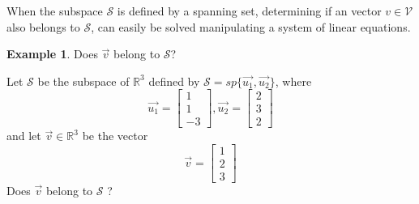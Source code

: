 \documentclass{book}
\theoremstyle{definition}
\newtheorem{example}{Example}[definition]
\theoremstyle{remark}
\newcommand{\bb}[1]{\mathbb{#1}}
\newcommand{\cc}[1]{\mathcal{#1}}
\begin{document}
When the subspace $\cc{S}$ is defined by a spanning set, determining if an vector $v \in \cc{V}$ also belongs to $\cc{S}$, can easily be solved manipulating a system of linear equations. 

\begin{example}
Does $\vec{v}$ belong to $\cc{S}$? \\
    
    \begin{tcolorbox}
        Let $\cc{S}$ be the subspace of $\bb{R}^3$ defined by $\cc{S} = sp\{\vec{u_1}, \vec{u_2} \}$, where 
            \begin{equation*}
                \vec{u_1} = \begin{bmatrix} 1 \\ 1 \\ -3 \end{bmatrix},  \vec{u_2} = \begin{bmatrix} 2 \\ 3 \\ 2 \end{bmatrix}
            \end{equation*}
        and let $\vec{v} \in \bb{R}^3$ be the vector
            \begin{equation*}
                \vec{v} = \begin{bmatrix} 1 \\ 2 \\ 3 \end{bmatrix}
            \end{equation*}
        Does $\vec{v}$ belong to $\cc{S}$ ?
    \end{tcolorbox}
    

\end{example}
\end{document}
